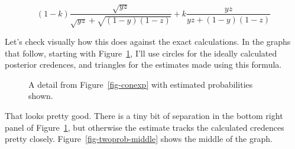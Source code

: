 \documentclass[
  10pt,
  letterpaper,
  DIV=11,
  numbers=noendperiod,
  twoside]{scrartcl}
\begin{document}
\[
(1-k)\frac{\sqrt{yz}}{\sqrt{yz} + \sqrt{(1-y)(1-z)}} + k\frac{yz}{yz + (1-y)(1-z)}
\]

Let's check visually how this does against the exact calculations. In
the graphs that follow, starting with
Figure~\ref{fig-twoprob-bottom-right}, I'll use circles for the ideally
calculated posterior credences, and triangles for the estimates made
using this formula.

\begin{figure}


\caption{\label{fig-twoprob-bottom-right}A detail from
Figure~\ref{fig-conexp} with estimated probabilities shown.}

\end{figure}%

That looks pretty good. There is a tiny bit of separation in the bottom
right panel of Figure~\ref{fig-twoprob-bottom-right}, but otherwise the
estimate tracks the calculated credences pretty closely.
Figure~\ref{fig-twoprob-middle} shows the middle of the graph.
\end{document}
